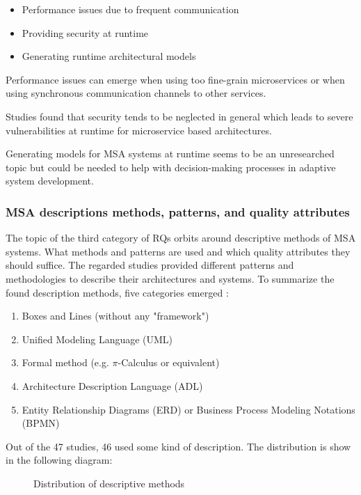 \begin{itemize}
    \item Performance issues due to frequent communication
    \item Providing security at runtime
    \item Generating runtime architectural models
\end{itemize}

Performance issues can emerge when using too fine-grain microservices
or when using synchronous communication channels to other services.

Studies found that security tends to be neglected in general which leads 
to severe vulnerabilities at runtime for microservice based architectures.

Generating models for MSA systems at runtime seems to be an unresearched
topic but could be needed to help with decision-making processes in
adaptive system development.


\subsubsection{MSA descriptions methods, patterns, and quality attributes}

The topic of the third category of RQs orbits around descriptive methods
of MSA systems. What methods and patterns are used and which
quality attributes they should suffice. The regarded studies provided
different patterns and methodologies to describe their architectures
and systems. To summarize the found description methods, five categories
emerged \cite{waseem:SMSMSADevOps}:

\begin{enumerate}
    \item Boxes and Lines (without any "framework")
    \item Unified Modeling Language (UML)
    \item Formal method (e.g. $\pi$-Calculus or equivalent)
    \item Architecture Description Language (ADL)
    \item Entity Relationship Diagrams (ERD) or Business
    Process Modeling Notations (BPMN)
\end{enumerate}

Out of the 47 studies, 46 used some kind of description.
The distribution is show in the following diagram:

\begin{figure}[H]
    \caption{Distribution of descriptive methods}
\end{figure}

